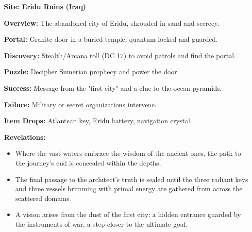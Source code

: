 \documentclass[12pt]{article}
\begin{document}
\textbf{Site: Eridu Ruins (Iraq)}

\textbf{Overview:}  
The abandoned city of Eridu, shrouded in sand and secrecy.

\textbf{Portal:}  
Granite door in a buried temple, quantum-locked and guarded.

\textbf{Discovery:}  
Stealth/Arcana roll (DC 17) to avoid patrols and find the portal.

\textbf{Puzzle:}  
Decipher Sumerian prophecy and power the door.

\textbf{Success:}  
Message from the "first city" and a clue to the ocean pyramids.

\textbf{Failure:}  
Military or secret organizations intervene.

\textbf{Item Drops:}  
Atlantean key, Eridu battery, navigation crystal.

\textbf{Revelations:}
\begin{itemize}
  \item Where the vast waters embrace the wisdom of the ancient ones, the path to the journey's end is concealed within the depths.
  \item The final passage to the architect's truth is sealed until the three radiant keys and three vessels brimming with primal energy are gathered from across the scattered domains.
  \item A vision arises from the dust of the first city: a hidden entrance guarded by the instruments of war, a step closer to the ultimate goal.
\end{itemize}
\end{document}
